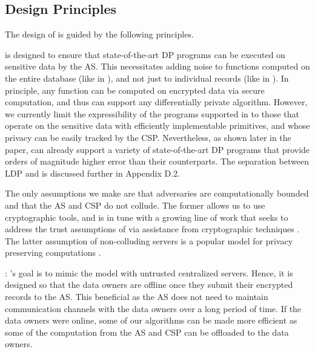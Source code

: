  

\subsection{\system Design Principles}\label{sec:discuss-arch}
The design of \system is guided by the following principles. 

 \system is designed to ensure that state-of-the-art DP programs can be executed on sensitive data by the \textsf{AS}. This necessitates adding noise to functions computed on the entire database (like in \cdp), and not just to individual records (like in \ldp). In principle, any function can be computed on encrypted data via secure computation, and thus \system can support any differentially private algorithm. However, we currently limit the expressibility of the programs supported in \system to those that operate on the sensitive data with efficiently implementable primitives, and whose privacy can be easily tracked by the \textsf{CSP}. Nevertheless, as shown later in the paper, \system can already support a variety of state-of-the-art DP programs that provide orders of magnitude higher error than their \ldp counterparts. The separation between \textsf{LDP} and \system is discussed further in Appendix D.2.

 The only assumptions we make are that adversaries are computationally bounded and that the \textsf{AS} and  \textsf{CSP} do not collude. The former allows us to use cryptographic tools, and is in tune with a growing line of work that seeks to address the trust assumptions of \cdp via assistance from cryptographic techniques \cite{Prochlo,mixnets,amplification,Shi,Shi2,kamara,Rastogi}. The latter assumption of non-colluding servers is a popular model for privacy preserving computations \cite{Boneh1,Boneh2,Ridge2,Matrix2,secureML,LReg,Ver}.

: \system's goal is to mimic the \cdp model with untrusted centralized servers. Hence, it is designed so that the data owners are offline once they submit their encrypted records to the \textsf{AS}. This beneficial as the \textsf{AS} does not need to maintain communication channels with the data owners over a long period of time. If the data owners were online, some of our algorithms can be made more efficient as some of the computation from the \textsf{AS} and \textsf{CSP} can be offloaded to the data owners.

